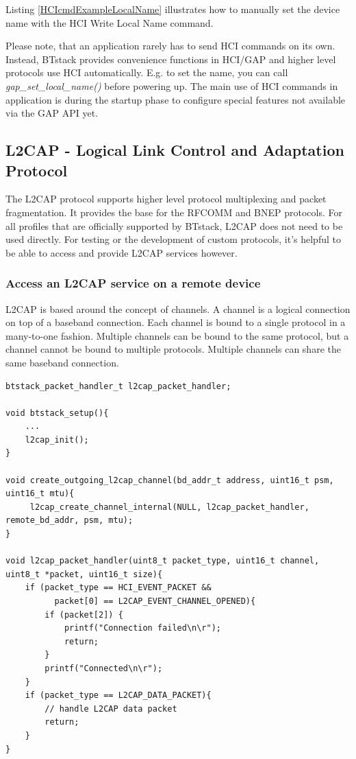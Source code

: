 Listing \ref{HCIcmdExampleLocalName} illustrates how to manually set the device name with the HCI Write Local Name command. 

Please note, that an application rarely has to send HCI commands on its own. Instead, BTstack provides convenience functions in HCI/GAP and higher level protocols use HCI automatically. E.g. to set the name, you can call \emph{gap\_set\_local\_name()} before powering up. The main use of HCI commands in application is during the startup phase to configure special features not available via the GAP API yet.



\subsection{L2CAP -  Logical Link Control and Adaptation Protocol}
The L2CAP protocol supports higher level protocol multiplexing and packet fragmentation. It provides the base for the RFCOMM and BNEP protocols. For all profiles that are officially supported by BTstack, L2CAP does not need to be used directly. For testing or the development of custom protocols, it's helpful to be able to access and provide L2CAP services however.

\subsubsection{Access an L2CAP service on a remote device}
L2CAP is based around the concept of channels. A channel is a logical connection on top of a baseband connection. Each channel is bound to a single protocol in a many-to-one fashion. Multiple channels can be bound to the same protocol, but a channel cannot be bound to multiple protocols. Multiple channels can share the same baseband connection.

\begin{lstlisting}[caption=L2CAP handler for outgoing L2CAP channel.,label=L2CAPremoteService]
btstack_packet_handler_t l2cap_packet_handler;

void btstack_setup(){
    ...
    l2cap_init();
}

void create_outgoing_l2cap_channel(bd_addr_t address, uint16_t psm, uint16_t mtu){
     l2cap_create_channel_internal(NULL, l2cap_packet_handler, remote_bd_addr, psm, mtu);
}

void l2cap_packet_handler(uint8_t packet_type, uint16_t channel, uint8_t *packet, uint16_t size){
    if (packet_type == HCI_EVENT_PACKET &&
          packet[0] == L2CAP_EVENT_CHANNEL_OPENED){
        if (packet[2]) {
            printf("Connection failed\n\r");
            return;
        }
        printf("Connected\n\r");
    }
    if (packet_type == L2CAP_DATA_PACKET){
        // handle L2CAP data packet
        return;
    }
}
\end{lstlisting}


